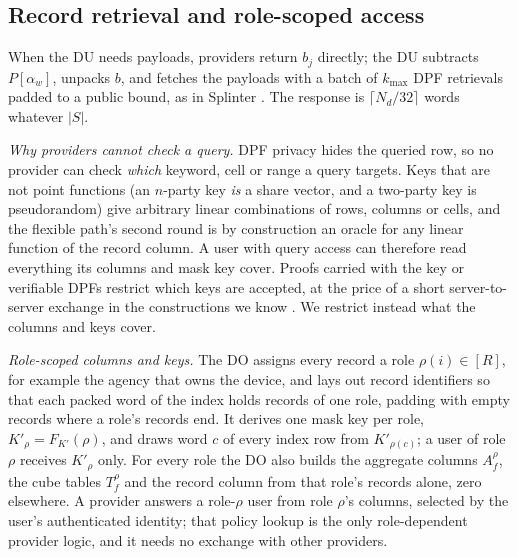 \documentclass[a4paper,fleqn]{cas-sc}
\begin{document}
\subsection{Record retrieval and role-scoped access}
\label{sec:auth}
When the DU needs payloads, providers return $b_j$ directly; the DU subtracts
$P[\alpha_w]$, unpacks $b$, and fetches the payloads with a batch of
$k_{\max}$ DPF retrievals padded to a public bound, as in Splinter
\citep{splinter}. The response is $\lceil N_d/32\rceil$ words whatever $|S|$.

\emph{Why providers cannot check a query.} DPF privacy hides the queried row,
so no provider can check \emph{which} keyword, cell or range a query targets.
Keys that are not point functions (an $n$-party key \emph{is} a share vector,
and a two-party key is pseudorandom) give arbitrary linear combinations of
rows, columns or cells, and the flexible path's second round is by
construction an oracle for any linear function of the record column. A user
with query access can therefore read everything its columns and mask key
cover. Proofs carried with the key \citep{pacl,ji2023finegrained} or verifiable
DPFs \citep{decastro2022lightweight} restrict which keys are accepted, at the
price of a short server-to-server exchange in the constructions we know
\citep{boneh2021lightweight}. We restrict instead what the columns and keys
cover.

\emph{Role-scoped columns and keys.} The DO assigns every record a role
$\rho(i)\in[R]$, for example the agency that owns the device, and lays out
record identifiers so that each packed word of the index holds records of one
role, padding with empty records where a role's records end. It derives one
mask key per role, $K'_\rho=F_{K'}(\rho)$, and draws word $c$ of every index row
from $K'_{\rho(c)}$; a user of role $\rho$ receives $K'_\rho$ only. For every
role the DO also builds the aggregate columns $A_f^{\rho}$, the cube tables
$T_f^{\rho}$ and the record column from that role's records alone, zero
elsewhere. A provider answers a role-$\rho$ user from role $\rho$'s columns,
selected by the user's authenticated identity; that policy lookup is the only
role-dependent provider logic, and it needs no exchange with other providers.
\end{document}
